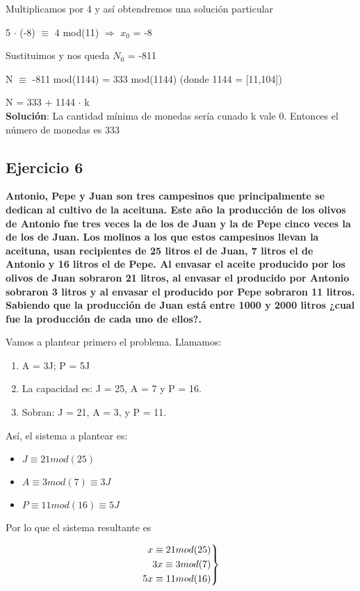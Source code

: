 \documentclass[11pt, a4paper, titlepage]{article}
\newenvironment{rcases}
  {\left.\begin{aligned}}
  {\end{aligned}\right\rbrace}
\begin{document}
Multiplicamos por 4 y así obtendremos una solución particular

5 $\cdot$ (-8) $\equiv$ 4 mod(11) $\Rightarrow$ $x_{0}$ = -8

Sustituimos y nos queda $N_{0}$ = -811 

N $\equiv$ -811 mod(1144) = 333 mod(1144) (donde 1144 = [11,104])

N = 333 + 1144 $\cdot$ k\\

\textbf{Solución}: La cantidad mínima de monedas sería cunado k vale 0. Entonces el número de monedas es 333\\


\subsection{\LARGE{Ejercicio 6}}
\textbf{Antonio, Pepe y Juan son tres campesinos que principalmente se
dedican al cultivo de la aceituna. Este año la producción de los olivos de
Antonio fue tres veces la de los de Juan y la de Pepe cinco veces la de los
de Juan. Los molinos a los que estos campesinos llevan la aceituna, usan
recipientes de 25 litros el de Juan, 7 litros el de Antonio y 16 litros el de
Pepe. Al envasar el aceite producido por los olivos de Juan sobraron 21
litros, al envasar el producido por Antonio sobraron 3 litros y al envasar el
producido por Pepe sobraron 11 litros. Sabiendo que la producción de Juan
está entre 1000 y 2000 litros ¿cual fue la producción de cada uno de ellos?.}

Vamos a plantear primero el problema. Llamamos:
\begin{enumerate}
	\item A = 3J; P = 5J
	\item La capacidad es: J = 25, A = 7 y P = 16.
	\item Sobran: J = 21, A = 3, y P = 11.
\end{enumerate}

Así, el sistema a plantear es:

\begin{itemize}
	\item $J \equiv 21 mod(25)$
	\item $A \equiv 3 mod(7) \equiv 3J$
	\item $P \equiv 11 mod(16) \equiv 5J$
\end{itemize}

Por lo que el sistema resultante es

\[
\begin{rcases}
	x \equiv 21 mod(25)\\
	3x \equiv 3 mod(7)\\
	5x \equiv 11 mod(16)
\end{rcases}
\]
\end{document}
